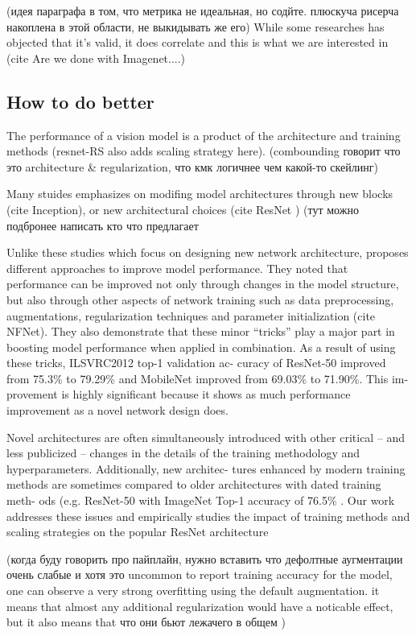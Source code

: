 (идея параграфа в том, что метрика не идеальная, но содйте. плюскуча рисерча накоплена в этой области, не выкидывать же его)
While some researches has objected that it's valid, it does correlate and this is what we are interested in (cite Are we done with Imagenet....)



\subsection{How to do better}


The performance of a vision model is a product of the architecture and training methods (resnet-RS also adds scaling strategy here).
(combounding говорит что это architecture & regularization, что кмк логичнее чем какой-то скейлинг) 

Many stuides emphasizes on modifing model architectures through new blocks (cite Inception), or new architectural choices (cite ResNet ) (тут можно подбронее написать кто что предлагает

Unlike these studies which focus on designing new network architecture, \cite{he2019bag_of_tricks} proposes different approaches to improve model performance. They noted that performance can be improved not only through changes in the model structure, but also through other aspects of network training such as data preprocessing, augmentations, regularization techniques and parameter initialization (cite NFNet). They also demonstrate that these minor “tricks” play a major part in boosting model performance when applied in combination. As a result of using these tricks, ILSVRC2012 top-1 validation ac- curacy of ResNet-50 improved from 75.3\% to 79.29\% and MobileNet improved from 69.03\% to 71.90\%. This im- provement is highly significant because it shows as much performance improvement as a novel network design does. 

Novel architectures are often simultaneously introduced with other critical – and less publicized – changes in the details of the training methodology and hyperparameters. Additionally, new architec- tures enhanced by modern training methods are sometimes compared to older architectures with dated training meth- ods (e.g. ResNet-50 with ImageNet Top-1 accuracy of 76.5\% \cite{he2016deep_resnetv2}. Our work addresses these issues and empirically studies the impact of training methods and scaling strategies on the popular ResNet architecture


(когда буду говорить про пайплайн, нужно вставить что дефолтные аугментации очень слабые и хотя это uncommon to report training accuracy for the model, one can observe a very strong overfitting using the default augmentation. it means that almost any additional regularization would have a noticable effect, but it also means that что они бьют лежачего в общем    )


